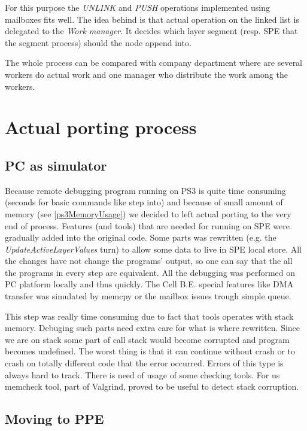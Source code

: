 \par
For this purpose the \emph{UNLINK} and \emph{PUSH} operations implemented using mailboxes fits well.
The idea behind is that actual operation on the linked list is delegated to the \emph{Work manager}.
It decides which layer segment (resp. SPE that the segment process) should the node append into.

\par
The whole process can be compared with company department where are several workers do actual work and one manager who distribute the work among the workers.

\section{Actual porting process}

\subsection{PC as simulator}

\par
Because remote debugging program running on PS3 is quite time consuming (seconds for basic commands like step into) and because of small amount of memory (see \ref{ps3MemoryUsage}) we decided to left actual porting to the very end of process.
Features (and tools) that are needed for running on SPE were gradually added into the original code.
Some parts was rewritten (e.g. the \emph{UpdateActiveLayerValues} turn) to allow some data to live in SPE local store.
All the changes have not change the programs' output, so one can say that the all the programs in every step are equivalent.
All the debugging was performed on PC platform locally and thus quickly.
The Cell B.E. special features like DMA transfer was simulated by memcpy or the mailbox issues trough simple queue.

\par
This step was really time consuming due to fact that tools operates with stack memory.
Debuging such parts need extra care for what is where rewritten.
Since we are on stack some part of call stack would become corrupted and program becomes undefined.
The worst thing is that it can continue without crash or to crash on totally different code that the error occurred.
Errors of this type is always hard to track.
There is need of usage of some checking tools.
For us memcheck tool, part of Valgrind, proved to be useful to detect stack corruption.

\subsection{Moving to PPE}

